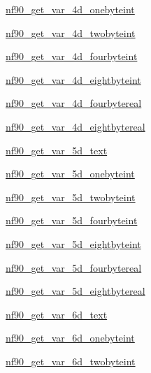 \begin{DoxyCompactItemize}
\item 
\hyperlink{interfacenf90__get__var_a3a85b42f9b8a94419781290911f18a0f}{nf90\+\_\+get\+\_\+var\+\_\+4d\+\_\+onebyteint}
\item 
\hyperlink{interfacenf90__get__var_ae3e86aa6470b2992c1ac4f08219a0bad}{nf90\+\_\+get\+\_\+var\+\_\+4d\+\_\+twobyteint}
\item 
\hyperlink{interfacenf90__get__var_a4acbfc64ae58fa392cbb35debbb2bd11}{nf90\+\_\+get\+\_\+var\+\_\+4d\+\_\+fourbyteint}
\item 
\hyperlink{interfacenf90__get__var_a194291b6c96ed6d9fef108f8aad6cc1c}{nf90\+\_\+get\+\_\+var\+\_\+4d\+\_\+eightbyteint}
\item 
\hyperlink{interfacenf90__get__var_aa2dd2ea34e9f17d352678d00185f0b8d}{nf90\+\_\+get\+\_\+var\+\_\+4d\+\_\+fourbytereal}
\item 
\hyperlink{interfacenf90__get__var_a38fbe5e0a6691e9ae1b9739a2ba4de02}{nf90\+\_\+get\+\_\+var\+\_\+4d\+\_\+eightbytereal}
\item 
\hyperlink{interfacenf90__get__var_accc74b8065a19986247a70ced571237b}{nf90\+\_\+get\+\_\+var\+\_\+5d\+\_\+text}
\item 
\hyperlink{interfacenf90__get__var_a56afab09ccdbd4d11305eba4dd752bf4}{nf90\+\_\+get\+\_\+var\+\_\+5d\+\_\+onebyteint}
\item 
\hyperlink{interfacenf90__get__var_af5d10f35b001bba98dbb9a3308991d3e}{nf90\+\_\+get\+\_\+var\+\_\+5d\+\_\+twobyteint}
\item 
\hyperlink{interfacenf90__get__var_acd76a4f2a00b428b13b78b446a80697b}{nf90\+\_\+get\+\_\+var\+\_\+5d\+\_\+fourbyteint}
\item 
\hyperlink{interfacenf90__get__var_aff2e66d9abc3d54efc96b1eb62e49cc3}{nf90\+\_\+get\+\_\+var\+\_\+5d\+\_\+eightbyteint}
\item 
\hyperlink{interfacenf90__get__var_a7435e27b5f18bec52da8621fc9ca40b2}{nf90\+\_\+get\+\_\+var\+\_\+5d\+\_\+fourbytereal}
\item 
\hyperlink{interfacenf90__get__var_a66d5d214aa6672b34d825cd089126398}{nf90\+\_\+get\+\_\+var\+\_\+5d\+\_\+eightbytereal}
\item 
\hyperlink{interfacenf90__get__var_a68d092b14b76b3364dc9e5570221905a}{nf90\+\_\+get\+\_\+var\+\_\+6d\+\_\+text}
\item 
\hyperlink{interfacenf90__get__var_a432a222111dd292d7ca55f32ded2fde9}{nf90\+\_\+get\+\_\+var\+\_\+6d\+\_\+onebyteint}
\item 
\hyperlink{interfacenf90__get__var_ab0c0ba2a1112e6da13e4daa8052ae83b}{nf90\+\_\+get\+\_\+var\+\_\+6d\+\_\+twobyteint}

\end{DoxyCompactItemize}
